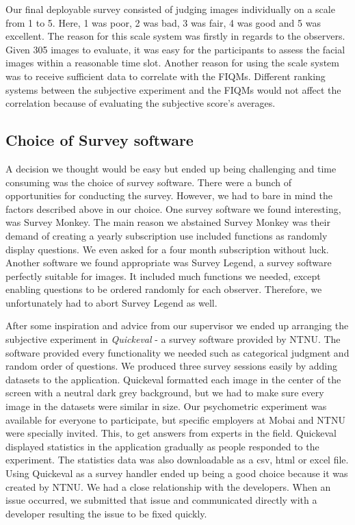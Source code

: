 Our final deployable survey consisted of judging images individually on a scale from 1 to 5. Here, 1 was poor, 2 was bad, 3 was fair, 4 was good and 5 was excellent. The reason for this scale system was firstly in regards to the observers. Given 305 images to evaluate, it was easy for the participants to assess the facial images within a reasonable time slot. Another reason for using the scale system was to receive sufficient data to correlate with the FIQMs. Different ranking systems between the subjective experiment and the FIQMs would not affect the correlation because of evaluating the subjective score's averages.

\subsection*{Choice of Survey software}
\label{subsection:choicesoftware}
A decision we thought would be easy but ended up being challenging and time consuming was the choice of survey software. There were a bunch of opportunities for conducting the survey. However, we had to bare in mind the factors described above in our choice. One survey software we found interesting, was Survey Monkey. The main reason we abstained Survey Monkey was their demand of creating a yearly subscription use included functions as randomly display questions. We even asked for a four month subscription without luck. Another software we found appropriate was Survey Legend, a survey software perfectly suitable for images. It included much functions we needed, except enabling questions to be ordered randomly for each observer. Therefore, we unfortunately had to abort Survey Legend as well. 

After some inspiration and advice from our supervisor we ended up arranging the subjective experiment in \textit{Quickeval} - a survey software provided by NTNU. The software provided every functionality we needed such as categorical judgment and random order of questions. We produced three survey sessions easily by adding datasets to the application. Quickeval formatted each image in the center of the screen with a neutral dark grey background, but we had to make sure every image in the datasets were similar in size. Our psychometric experiment was available for everyone to participate, but specific employers at Mobai and NTNU were specially invited. This, to get answers from experts in the field. Quickeval displayed statistics in the application gradually as people responded to the experiment. The statistics data was also downloadable as a csv, html or excel file. 
Using Quickeval as a survey handler ended up being a good choice because it was created by NTNU. We had a close relationship with the developers. When an issue occurred, we submitted that issue and communicated directly with a developer resulting the issue to be fixed quickly. 

